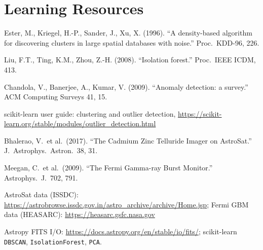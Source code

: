 \documentclass[11pt,a4paper]{article}
\begin{document}
\section*{Learning Resources}
\begin{resources}
  \item Ester, M., Kriegel, H.-P., Sander, J., Xu, X. (1996). ``A density-based algorithm for discovering clusters in large spatial databases with noise.'' Proc.\ KDD-96, 226.
  \item Liu, F.T., Ting, K.M., Zhou, Z.-H. (2008). ``Isolation forest.'' Proc.\ IEEE ICDM, 413.
  \item Chandola, V., Banerjee, A., Kumar, V. (2009). ``Anomaly detection: a survey.'' ACM Computing Surveys 41, 15.
  \item scikit-learn user guide: clustering and outlier detection, \url{https://scikit-learn.org/stable/modules/outlier_detection.html}
\end{resources}
\begin{resources}
  \item Bhalerao, V.\ et al.\ (2017). ``The Cadmium Zinc Telluride Imager on AstroSat.'' J.\ Astrophys.\ Astron.\ 38, 31.
  \item Meegan, C.\ et al.\ (2009). ``The Fermi Gamma-ray Burst Monitor.'' Astrophys.\ J.\ 702, 791.
  \item AstroSat data (ISSDC): \url{https://astrobrowse.issdc.gov.in/astro_archive/archive/Home.jsp}; Fermi GBM data (HEASARC): \url{https://heasarc.gsfc.nasa.gov}
\end{resources}
\begin{resources}
  \item Astropy FITS I/O: \url{https://docs.astropy.org/en/stable/io/fits/}; scikit-learn \texttt{DBSCAN}, \texttt{IsolationForest}, \texttt{PCA}.
\end{resources}

\evaluation
\end{document}
